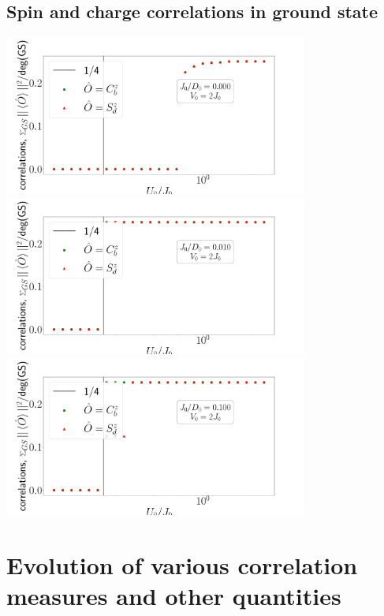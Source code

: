 \documentclass{report}
\numberwithin{equation}{section}
\begin{document}
\subsection*{Spin and charge correlations in ground state}
\begin{center}
	\includegraphics[width=0.75\textwidth]{../figures/corrs_gs-J=0.050.pdf}\\
	\includegraphics[width=0.75\textwidth]{../figures/corrs_gs-J=5.000.pdf}\\
	\includegraphics[width=0.75\textwidth]{../figures/corrs_gs-J=50.000.pdf}
\end{center}


\section{Evolution of various correlation measures and other quantities}
\end{document}
